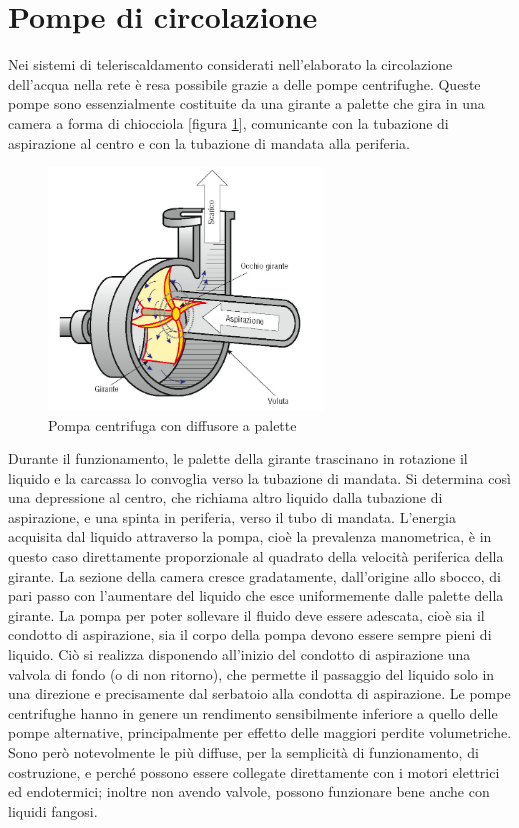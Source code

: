 \documentclass[laurea,oneside,11pt]{USiena_tesiLM}
\begin{document}
\section{Pompe di circolazione}
Nei sistemi di teleriscaldamento considerati nell'elaborato la circolazione dell'acqua nella rete è resa possibile grazie a delle pompe centrifughe. Queste pompe sono essenzialmente costituite da una girante a palette che gira in una camera a forma di chiocciola [figura \ref{fig:pompa_centrifuga}], comunicante con la tubazione di aspirazione al centro e con la tubazione di mandata alla periferia.

\begin{figure}[h]
\centering
\includegraphics[width=0.65\textwidth]{figure/pompa_centrifuga} 
\caption{Pompa centrifuga con diffusore a palette}
\label{fig:pompa_centrifuga}
\end{figure}

Durante il funzionamento, le palette della girante trascinano in rotazione il liquido e la carcassa lo convoglia verso la tubazione di mandata.
Si determina così una depressione al centro, che richiama altro liquido dalla tubazione di aspirazione, e una spinta in periferia, verso il tubo di mandata.
L'energia acquisita dal liquido attraverso la pompa, cioè la prevalenza manometrica, è in questo caso direttamente proporzionale al quadrato della velocità periferica della girante.
La sezione della camera cresce gradatamente, dall'origine allo sbocco, di pari passo con l'aumentare del liquido che esce uniformemente dalle palette della girante.
La pompa per poter sollevare il fluido deve
essere adescata, cioè sia il condotto di
aspirazione, sia il corpo della pompa devono essere sempre pieni di liquido. Ciò si realizza disponendo all'inizio del condotto di aspirazione una valvola di fondo (o di non ritorno), che permette il passaggio del liquido solo in una direzione e precisamente dal serbatoio alla condotta di aspirazione.
Le pompe centrifughe hanno in genere un rendimento sensibilmente inferiore a quello delle pompe alternative, principalmente per effetto delle maggiori perdite volumetriche. Sono però notevolmente le più diffuse, per la semplicità di funzionamento, di costruzione, e perché possono essere collegate direttamente con i motori elettrici ed endotermici; inoltre non avendo valvole, possono funzionare bene anche con liquidi fangosi.
\end{document}
